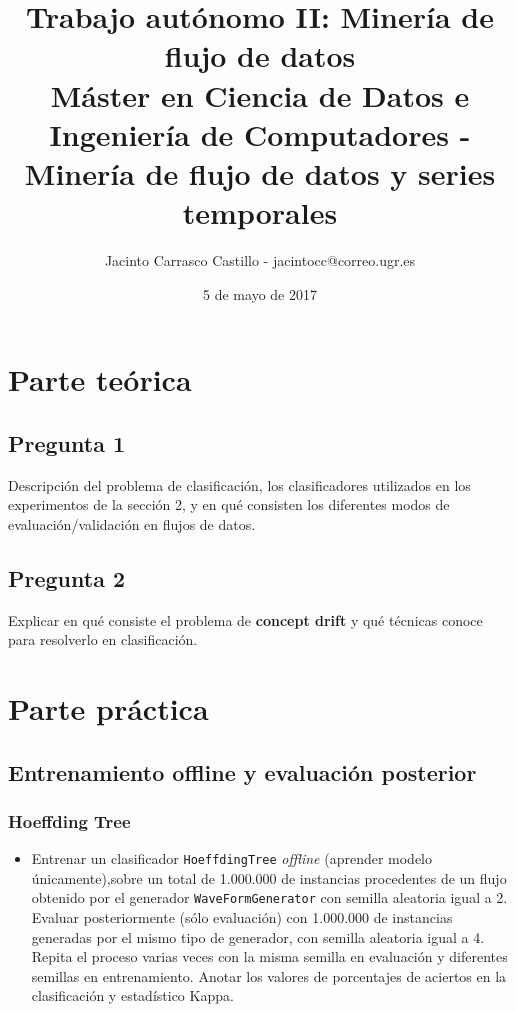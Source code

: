 \documentclass[11pt]{article}
\author{Jacinto Carrasco Castillo - jacintocc@correo.ugr.es}
\date{5 de mayo de 2017}
\title{Trabajo autónomo II: Minería de flujo de datos\\\medskip
\large Máster en Ciencia de Datos e Ingeniería de Computadores - Minería de flujo de datos y series temporales}
\begin{document}
\maketitle
\tableofcontents



\section{Parte teórica}
\label{sec:org78b2585}

\subsection{Pregunta 1}
\label{sec:org9fb51c3}

Descripción del problema de clasificación, los clasificadores
utilizados en los experimentos de la sección 2, y en qué consisten los
diferentes modos de evaluación/validación en flujos de datos.

\subsection{Pregunta 2}
\label{sec:orgd52cc5f}

Explicar en qué consiste el problema de \textbf{\textbf{concept drift}}
y qué técnicas conoce para resolverlo en clasificación.




\section{Parte práctica}
\label{sec:org048e30d}

\subsection{Entrenamiento offline y evaluación posterior}
\label{sec:orgf531c4d}
\subsubsection{Hoeffding Tree}
\label{sec:orgf0410a7}
\begin{itemize}
\item Entrenar un clasificador \texttt{HoeffdingTree} \emph{offline} (aprender modelo
únicamente),sobre un total de 1.000.000 de instancias procedentes de
un flujo obtenido por el generador \texttt{WaveFormGenerator} con semilla
aleatoria igual a 2. Evaluar posteriormente (sólo evaluación) con
1.000.000 de instancias generadas por el mismo tipo de generador,
con semilla aleatoria igual a 4. Repita el proceso varias veces con
la misma semilla en evaluación y diferentes semillas en
entrenamiento. Anotar los valores de porcentajes de aciertos en la
clasificación y estadístico Kappa.
\end{itemize}
\end{document}
